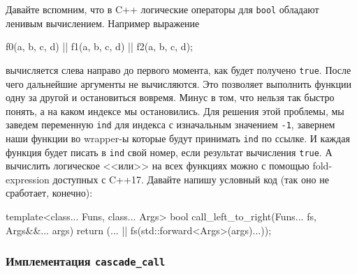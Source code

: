 Давайте вспомним, что в C++ логические операторы для \verb"bool" обладают ленивым вычислением.
Например выражение
\begin{cppcode}[\nonumbers]
f0(a, b, c, d) || f1(a, b, c, d) || f2(a, b, c, d);
\end{cppcode}
вычисляется слева направо до первого момента, как будет получено \verb"true".
После чего дальнейшие аргументы не вычисляются.
Это позволяет выполнить функции одну за другой и остановиться вовремя.
Минус в том, что нельзя так быстро понять, а на каком индексе мы остановились.
Для решения этой проблемы, мы заведем переменную \verb"ind" для индекса с изначальным значением \verb"-1", завернем наши функции во wrapper-ы которые будут принимать \verb"ind" по ссылке.
И каждая функция будет писать в \verb"ind" свой номер, если результат вычисления \verb"true".
А вычислить логическое <<или>> на всех функциях можно с помощью fold-expression доступных с C++17.
Давайте напишу условный код (так оно не сработает, конечно):
\begin{cppcode}[\nonumbers]
template<class... Funs, class... Args>
bool call_left_to_right(Funs... fs, Args&&... args) {
  return (... || fs(std::forward<Args>(args)...)); 
}
\end{cppcode}

\subsubsection{Имплементация \texttt{cascade\_call}}


